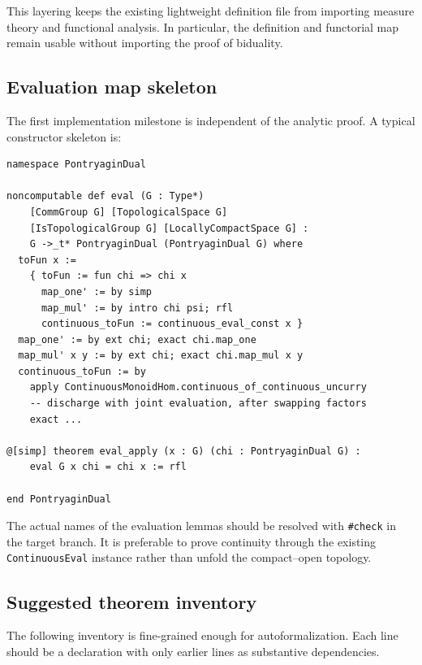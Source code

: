 \documentclass[11pt]{article}
\theoremstyle{definition}
\theoremstyle{remark}
\begin{document}
This layering keeps the existing lightweight definition file from importing measure
theory and functional analysis.  In particular, the definition and functorial map remain
usable without importing the proof of biduality.

\subsection{Evaluation map skeleton}

The first implementation milestone is independent of the analytic proof.  A typical
constructor skeleton is:

\begin{lstlisting}
namespace PontryaginDual

noncomputable def eval (G : Type*)
    [CommGroup G] [TopologicalSpace G]
    [IsTopologicalGroup G] [LocallyCompactSpace G] :
    G ->_t* PontryaginDual (PontryaginDual G) where
  toFun x :=
    { toFun := fun chi => chi x
      map_one' := by simp
      map_mul' := by intro chi psi; rfl
      continuous_toFun := continuous_eval_const x }
  map_one' := by ext chi; exact chi.map_one
  map_mul' x y := by ext chi; exact chi.map_mul x y
  continuous_toFun := by
    apply ContinuousMonoidHom.continuous_of_continuous_uncurry
    -- discharge with joint evaluation, after swapping factors
    exact ...

@[simp] theorem eval_apply (x : G) (chi : PontryaginDual G) :
    eval G x chi = chi x := rfl

end PontryaginDual
\end{lstlisting}

The actual names of the evaluation lemmas should be resolved with \texttt{\#check} in the
target branch.  It is preferable to prove continuity through the existing
\texttt{ContinuousEval} instance rather than unfold the compact--open topology.

\subsection{Suggested theorem inventory}

The following inventory is fine-grained enough for autoformalization.  Each line should
be a declaration with only earlier lines as substantive dependencies.
\end{document}

